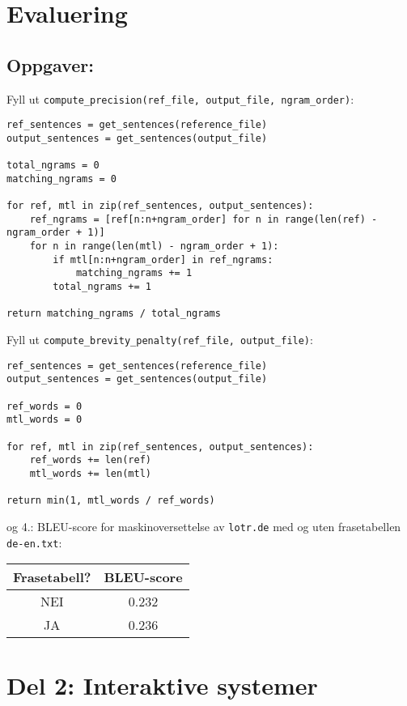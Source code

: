 \documentclass{article}
\begin{document}
\section{Evaluering}
\subsection*{Oppgaver:}
\begin{outline}[enumerate]
\1 Fyll ut \verb|compute_precision(ref_file, output_file, ngram_order)|:
\begin{verbatim}
ref_sentences = get_sentences(reference_file)
output_sentences = get_sentences(output_file)
    
total_ngrams = 0
matching_ngrams = 0

for ref, mtl in zip(ref_sentences, output_sentences):
    ref_ngrams = [ref[n:n+ngram_order] for n in range(len(ref) - ngram_order + 1)]
    for n in range(len(mtl) - ngram_order + 1):
        if mtl[n:n+ngram_order] in ref_ngrams:
            matching_ngrams += 1
        total_ngrams += 1

return matching_ngrams / total_ngrams
\end{verbatim}

\1 Fyll ut \verb|compute_brevity_penalty(ref_file, output_file)|:
\begin{verbatim}
ref_sentences = get_sentences(reference_file)
output_sentences = get_sentences(output_file)

ref_words = 0
mtl_words = 0

for ref, mtl in zip(ref_sentences, output_sentences):
    ref_words += len(ref)
    mtl_words += len(mtl)

return min(1, mtl_words / ref_words)
\end{verbatim}

\1 og 4.:\newline
BLEU-score for maskinoversettelse av \verb|lotr.de| med og uten frasetabellen \verb|de-en.txt|:\newline\newline
\begin{tabular}{ | c | c | }
    \hline
    Frasetabell? & BLEU-score \\
    \hline
    NEI & 0.232 \\
    \hline
    JA & 0.236 \\
    \hline
\end{tabular}
\end{outline}
\newpage

\section*{Del 2: Interaktive systemer}
\end{document}
